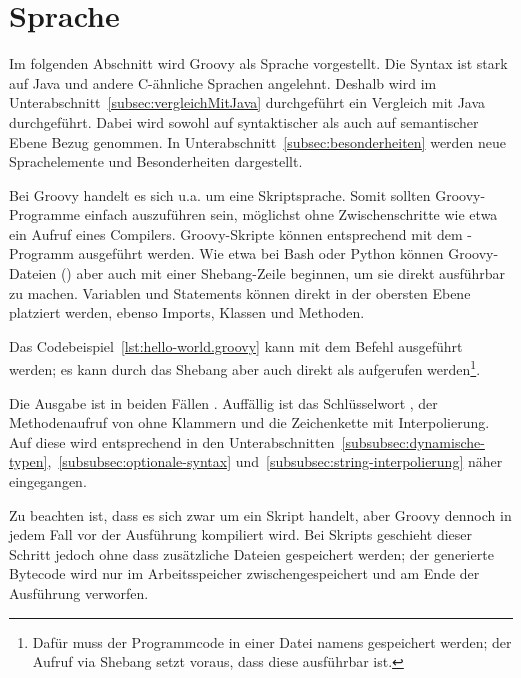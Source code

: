 	\section{Sprache}\label{sec:sprache}

	Im folgenden Abschnitt wird Groovy als Sprache vorgestellt.
	Die Syntax ist stark auf Java und andere C-ähnliche Sprachen angelehnt.
	Deshalb wird im Unterabschnitt~\ref{subsec:vergleichMitJava} durchgeführt ein Vergleich mit Java durchgeführt.
	Dabei wird sowohl auf syntaktischer als auch auf semantischer Ebene Bezug genommen.
	In Unterabschnitt~\ref{subsec:besonderheiten} werden neue Sprachelemente und Besonderheiten dargestellt.

	Bei Groovy handelt es sich {u.a.} um eine Skriptsprache.
	Somit sollten Groovy-Programme einfach auszuführen sein, möglichst ohne Zwischenschritte wie etwa ein Aufruf eines Compilers.
	Groovy-Skripte können entsprechend mit dem -Programm ausgeführt werden.
	Wie etwa bei Bash oder Python können Groovy-Dateien () aber auch mit einer Shebang-Zeile beginnen, um sie direkt ausführbar zu machen.
	Variablen und Statements können direkt in der obersten Ebene platziert werden, ebenso Imports, Klassen und Methoden.


	Das Codebeispiel~\ref{lst:hello-world.groovy} kann mit dem Befehl   ausgeführt werden;
	es kann durch das Shebang aber auch direkt als  aufgerufen werden\footnote{Dafür muss der Programmcode in einer Datei namens  gespeichert werden; der Aufruf via Shebang setzt voraus, dass diese ausführbar ist.}.

	Die Ausgabe ist in beiden Fällen .
	Auffällig ist das Schlüsselwort , der Methodenaufruf von  ohne Klammern und die Zeichenkette mit Interpolierung.
	Auf diese wird entsprechend in den Unterabschnitten~\ref{subsubsec:dynamische-typen},~\ref{subsubsec:optionale-syntax} und~\ref{subsubsec:string-interpolierung} näher eingegangen.

	Zu beachten ist, dass es sich zwar um ein Skript handelt, aber Groovy dennoch in jedem Fall vor der Ausführung kompiliert wird.
	Bei Skripts geschieht dieser Schritt jedoch ohne dass zusätzliche Dateien gespeichert werden;
	der generierte Bytecode wird nur im Arbeitsspeicher zwischengespeichert und am Ende der Ausführung verworfen.

